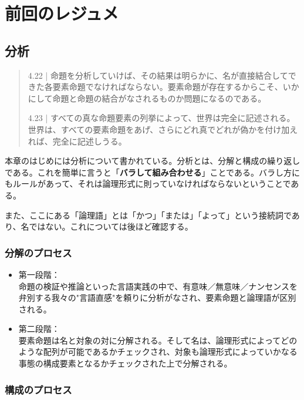 \documentclass[11pt,a4paper,onecolumn,article]{jarticle}
\newcounter{ct}               %
\begin{document}
\section{前回のレジュメ}
{\small

\subsection{分析}

\begin{quote}

4.22 | 命題を分析していけば、その結果は明らかに、名が直接結合してできた各要素命題でなければならない。要素命題が存在するからこそ、いかにして命題と命題の結合がなされるものか問題になるのである。

4.23 | すべての真な命題要素の列挙によって、世界は完全に記述される。世界は、すべての要素命題をあげ、さらにどれ真でどれが偽かを付け加えれば、完全に記述しうる。


\end{quote}

本章のはじめには分析について書かれている。分析とは、分解と構成の繰り返しである。これを簡単に言うと「{\bf{バラして組み合わせる}}」ことである。バラし方にもルールがあって、それは論理形式に則っていなければならないということである。

また、ここにある「論理語」とは「かつ」「または」「よって」という接続詞であり、名ではない。これについては後ほど確認する。


\subsubsection{分解のプロセス}

\begin{itemize}

\item 第一段階：\\命題の検証や推論といった言語実践の中で、有意味／無意味／ナンセンスを弁別する我々の"言語直感"を頼りに分析がなされ、要素命題と論理語が区別される。

\item 第二段階：\\要素命題は名と対象の対に分解される。そして名は、論理形式によってどのような配列が可能であるかチェックされ、対象も論理形式によっていかなる事態の構成要素となるかチェックされた上で分解される。

\end{itemize}



\subsubsection{構成のプロセス}

}
\end{document}
